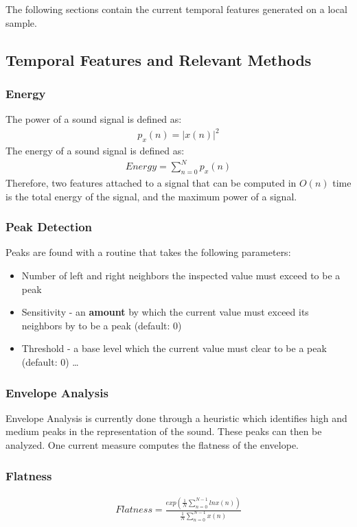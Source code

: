 \documentclass[DIV=calc, paper=a4, fontsize=11pt, twocolumn]{scrartcl}   %
\begin{document}
\par The following sections contain the current temporal features generated on a local sample.


\subsection{Temporal Features and Relevant Methods}
\subsubsection {Energy}
   The power of a sound signal is defined as:
   \begin{align}
      p_x(n) = |x(n)|^2
   \end{align}
   The energy of a sound signal is defined as:
   \begin{align}
     Energy = \sum_{n=0}^N p_x(n)
   \end{align}
   Therefore, two features attached to a signal that can be computed in $O(n)$ time is the total energy of the signal, and the maximum power of a signal.
   \subsubsection {Peak Detection}
   Peaks are found with a routine that takes the following parameters:
      \begin{itemize}
        \item Number of left and right neighbors the inspected value must exceed to be a peak
        \item Sensitivity - an \textbf{amount} by which the current value must exceed its neighbors by to be a peak (default: 0)
        \item Threshold - a base level which the current value must clear to be a peak (default: 0) \ldots
      \end{itemize}
   \subsubsection {Envelope Analysis}
   Envelope Analysis is currently done through a heuristic which identifies high and medium peaks in the representation of the sound. These peaks can then be analyzed. One current measure computes the flatness of the envelope.
   \subsubsection{Flatness}
      \begin{align}
      Flatness = \frac{exp(\frac{1}{N}\sum_{n=0}^{N-1}lnx(n))}{\frac{1}{N}\sum_{n=0}^{N-1}x(n)}
      \end{align}
\end{document}
